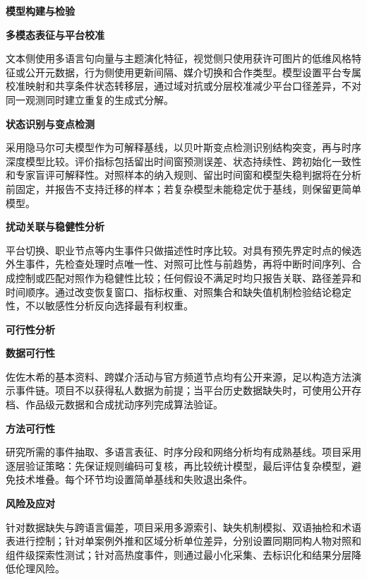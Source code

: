 \noindent\textbf{模型构建与检验}\par

\noindent\textbf{多模态表征与平台校准}\par
文本侧使用多语言句向量与主题演化特征，视觉侧只使用获许可图片的低维风格特征或公开元数据，行为侧使用更新间隔、媒介切换和合作类型。模型设置平台专属校准映射和共享条件状态转移层，通过域对抗或分层校准减少平台口径差异，不对同一观测同时建立重复的生成式分解。

\noindent\textbf{状态识别与变点检测}\par
采用隐马尔可夫模型作为可解释基线，以贝叶斯变点检测识别结构突变，再与时序深度模型比较。评价指标包括留出时间窗预测误差、状态持续性、跨初始化一致性和专家盲评可解释性。对照样本的纳入规则、留出时间窗和模型失稳判据将在分析前固定，并报告不支持迁移的样本；若复杂模型未能稳定优于基线，则保留更简单模型。

\noindent\textbf{扰动关联与稳健性分析}\par
平台切换、职业节点等内生事件只做描述性时序比较。对具有预先界定时点的候选外生事件，先检查处理时点唯一性、对照可比性与前趋势，再将中断时间序列、合成控制或匹配对照作为稳健性比较；任何假设不满足时均只报告关联、路径差异和时间顺序。通过改变恢复窗口、指标权重、对照集合和缺失值机制检验结论稳定性，不以敏感性分析反向选择最有利权重。

\noindent\textbf{可行性分析}\par

\noindent\textbf{数据可行性}\par
佐佐木希的基本资料、跨媒介活动与官方频道节点均有公开来源，足以构造方法演示事件链。项目不以获得私人数据为前提；当平台历史数据缺失时，可使用公开存档、作品级元数据和合成扰动序列完成算法验证。

\noindent\textbf{方法可行性}\par
研究所需的事件抽取、多语言表征、时序分段和网络分析均有成熟基线。项目采用逐层验证策略：先保证规则编码可复核，再比较统计模型，最后评估复杂模型，避免技术堆叠。每个环节均设置简单基线和失败退出条件。

\noindent\textbf{风险及应对}\par
针对数据缺失与跨语言偏差，项目采用多源索引、缺失机制模拟、双语抽检和术语表进行控制；针对单案例外推和区域分析单位差异，分别设置同期同构人物对照和组件级探索性测试；针对高热度事件，则通过最小化采集、去标识化和结果分层降低伦理风险。
